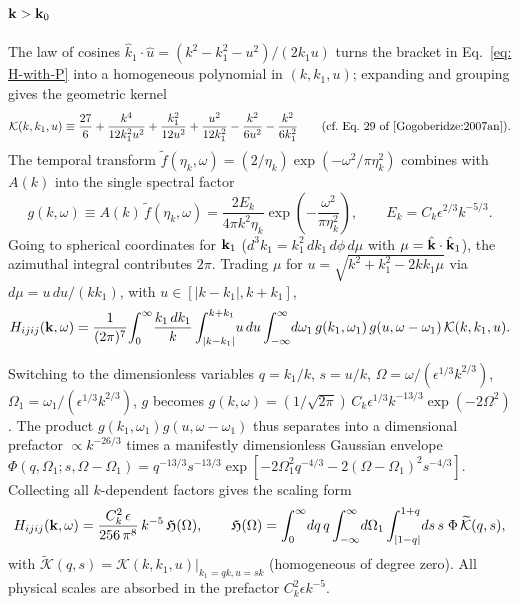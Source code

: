 \documentclass[10pt,prd,aps,nobibnotes,superscriptaddress,preprintnumbers,notitlepage]{revtex4-1}
\newcommand{\khat}{\hat{k}}
\newcommand{\kb}{{\bf k}}
\newcommand{\tf}{\tilde{f}}
\begin{document}
\subsection{\texorpdfstring{$\kb > \kb_0$}{k > k0}}

The law of cosines $\khat_1\cdot\hat u = (k^2-k_1^2-u^2)/(2k_1 u)$ turns the bracket in Eq.~\eqref{eq: H-with-P} into a homogeneous polynomial in $(k,k_1,u)$; expanding and grouping gives the geometric kernel
\begin{equation}
  \mathcal{K}(k,k_1,u)\equiv \frac{27}{6}+\frac{k^4}{12k_1^2u^2}+\frac{k_1^2}{12u^2}+\frac{u^2}{12k_1^2}
  -\frac{k^2}{6u^2}-\frac{k^2}{6k_1^2}
  \qquad (\text{cf.\ Eq.~29 of \cite{Gogoberidze:2007an}}).
  \label{eq: K-kernel}
\end{equation}
The temporal transform $\tf(\eta_k,\omega) = (2/\eta_k)\exp(-\omega^2/\pi\eta_k^2)$ combines with $A(k)$ into the single spectral factor
\begin{equation}
  g(k,\omega) \equiv A(k)\,\tf(\eta_k,\omega) = \frac{2E_k}{4\pi k^2\eta_k}\exp\!\left(-\frac{\omega^2}{\pi\eta_k^2}\right),
  \qquad E_k = C_k\epsilon^{2/3}k^{-5/3}.
  \label{eq: g-def}
\end{equation}
Going to spherical coordinates for $\kb_1$ ($d^3k_1 = k_1^2\,dk_1\,d\phi\,d\mu$ with $\mu=\hat\kb\cdot\hat\kb_1$), the azimuthal integral contributes $2\pi$. Trading $\mu$ for $u=\sqrt{k^2+k_1^2-2kk_1\mu}$ via $d\mu = u\,du/(k k_1)$, with $u\in[|k-k_1|,k+k_1]$,
\begin{equation}
  H_{ijij}(\kb,\omega) = \frac{1}{(2\pi)^7}\!\int_0^\infty\!\frac{k_1\,dk_1}{k}\int_{|k-k_1|}^{k+k_1}\!u\,du\int_{-\infty}^\infty\! d\omega_1\,
  g(k_1,\omega_1)\,g(u,\omega-\omega_1)\,\mathcal K(k,k_1,u).
  \label{eq: conversion}
\end{equation}

Switching to the dimensionless variables $q=k_1/k$, $s=u/k$, $\Omega=\omega/(\epsilon^{1/3}k^{2/3})$, $\Omega_1=\omega_1/(\epsilon^{1/3}k^{2/3})$, $g$ becomes $g(k,\omega)=(1/\sqrt{2\pi})\,C_k\epsilon^{1/3}k^{-13/3}\exp(-2\Omega^2)$. The product $g(k_1,\omega_1)g(u,\omega-\omega_1)$ thus separates into a dimensional prefactor $\propto k^{-26/3}$ times a manifestly dimensionless Gaussian envelope $\Phi(q,\Omega_1;s,\Omega-\Omega_1) = q^{-13/3}s^{-13/3}\exp[-2\Omega_1^2q^{-4/3}-2(\Omega-\Omega_1)^2s^{-4/3}]$. Collecting all $k$-dependent factors gives the scaling form
\begin{equation}
  H_{ijij}(\kb,\omega) = \frac{C_k^2\,\epsilon}{256\,\pi^8}\,k^{-5}\,\mathfrak H(\Omega),
  \qquad
  \mathfrak H(\Omega) = \int_0^\infty\!dq\,q\int_{-\infty}^\infty\!d\Omega_1\int_{|1-q|}^{1+q}\!ds\,s\;\Phi\,\widetilde{\mathcal K}(q,s),
  \label{eq: H-compact}
\end{equation}
with $\widetilde{\mathcal K}(q,s)=\mathcal K(k,k_1,u)|_{k_1=qk,u=sk}$ (homogeneous of degree zero). All physical scales are absorbed in the prefactor $C_k^2\epsilon k^{-5}$.
\end{document}
